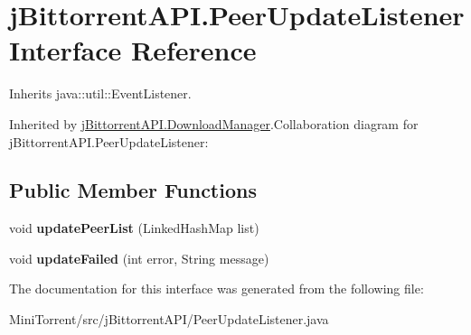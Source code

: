 \hypertarget{interfacej_bittorrent_a_p_i_1_1_peer_update_listener}{
\section{jBittorrentAPI.PeerUpdateListener Interface Reference}
\label{interfacej_bittorrent_a_p_i_1_1_peer_update_listener}
}


Inherits java::util::EventListener.

Inherited by \hyperlink{classj_bittorrent_a_p_i_1_1_download_manager}{jBittorrentAPI.DownloadManager}.Collaboration diagram for jBittorrentAPI.PeerUpdateListener:\subsection*{Public Member Functions}
\begin{DoxyCompactItemize}
\item 
\hypertarget{interfacej_bittorrent_a_p_i_1_1_peer_update_listener_a28dd4025670779559010b630c3f3dfaf}{
void {\bfseries updatePeerList} (LinkedHashMap list)}
\label{interfacej_bittorrent_a_p_i_1_1_peer_update_listener_a28dd4025670779559010b630c3f3dfaf}

\item 
\hypertarget{interfacej_bittorrent_a_p_i_1_1_peer_update_listener_ac54bb816187df7a8e3ab0c0d563081fc}{
void {\bfseries updateFailed} (int error, String message)}
\label{interfacej_bittorrent_a_p_i_1_1_peer_update_listener_ac54bb816187df7a8e3ab0c0d563081fc}

\end{DoxyCompactItemize}


The documentation for this interface was generated from the following file:\begin{DoxyCompactItemize}
\item 
MiniTorrent/src/jBittorrentAPI/PeerUpdateListener.java\end{DoxyCompactItemize}
